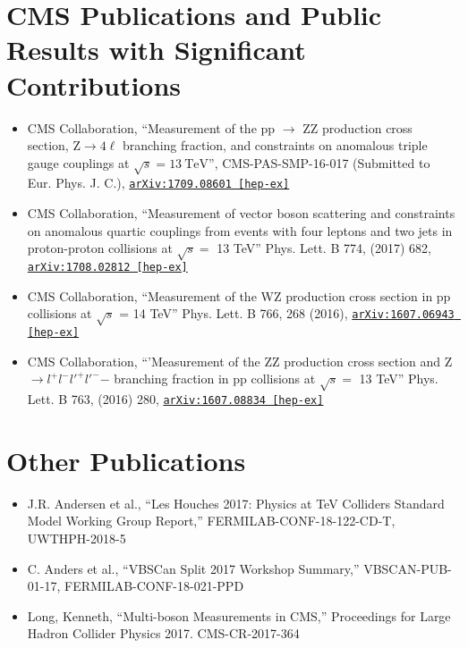 \documentclass[10pt]{res} %
\begin{document}
\begin{resume}
\section{CMS Publications and Public Results with Significant Contributions}
\begin{itemize}
  \item CMS Collaboration, ``Measurement of the pp $\rightarrow$ ZZ production cross section, $\mathrm{Z} \to 4\ell$ branching fraction, and constraints on anomalous triple gauge couplings at $\sqrt{s} = 13~\mathrm{TeV}$'', CMS-PAS-SMP-16-017 (Submitted to Eur. Phys. J. C.), \href{https://arxiv.org/abs/1709.08601}{\texttt{arXiv:1709.08601 [hep-ex]}}
  \item CMS Collaboration, ``Measurement of vector boson scattering and constraints on anomalous quartic couplings from events with four leptons and two jets in proton-proton collisions at $\sqrt{s} =$ 13 TeV''
    Phys. Lett. B 774, (2017) 682, \href{https://arxiv.org/abs/1708.02812}{\texttt{arXiv:1708.02812 [hep-ex]}}
  \item CMS Collaboration, ``Measurement of the WZ production cross section in pp collisions at $\sqrt{s}$ = 14 TeV''
Phys. Lett. B 766, 268 (2016), \href{https://arxiv.org/abs/1607.06943}{\texttt{arXiv:1607.06943 [hep-ex]}}
  \item CMS Collaboration, ``'Measurement of the ZZ production cross section and Z $\rightarrow l^{+}l^{-}l'^{+}l'^{-}$− branching fraction in pp collisions at $\sqrt{s} =$ 13 TeV''
Phys. Lett. B 763, (2016) 280, \href{https://arxiv.org/abs/1607.08834} {\texttt{arXiv:1607.08834 [hep-ex]}}
\end{itemize}

\section{Other Publications}
\begin{itemize}
  \item J.R. Andersen et al., ``Les Houches 2017: Physics at TeV Colliders Standard Model Working Group Report,''
    FERMILAB-CONF-18-122-CD-T, UWTHPH-2018-5
  \item C. Anders et al., ``VBSCan Split 2017 Workshop Summary,'' 
    VBSCAN-PUB-01-17, FERMILAB-CONF-18-021-PPD
  \item Long, Kenneth, ``Multi-boson Measurements in CMS,''
    Proceedings for Large Hadron Collider Physics 2017. CMS-CR-2017-364
\end{itemize}


\end{resume}
\end{document}
